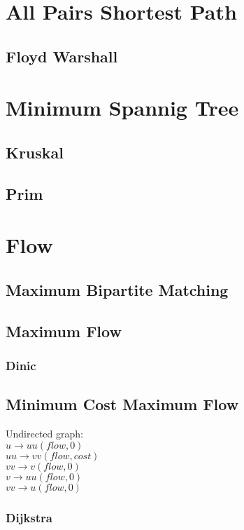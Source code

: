 \documentclass[10pt,a4paper]{report}
\begin{document}
	\section{All Pairs Shortest Path}
		\subsection{Floyd Warshall}
		
	\section{Minimum Spannig Tree}
		\subsection{Kruskal}
		\subsection{Prim}
	
	\newpage
	\section{Flow}
		\subsection{Maximum Bipartite Matching}
			
		\newpage
		\subsection{Maximum Flow}
			\subsubsection{Dinic}
				
		\newpage
		\subsection{Minimum Cost Maximum Flow}
			Undirected graph:\\
			$u \rightarrow uu(flow, 0)$\\
			$uu \rightarrow vv(flow, cost)$\\
			$vv \rightarrow v(flow, 0)$\\
			$v \rightarrow uu(flow, 0)$\\
			$vv \rightarrow u(flow, 0)$
			\subsubsection{Dijkstra}
				
			\newpage
\end{document}
